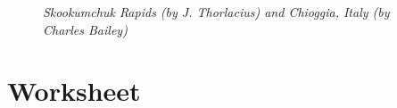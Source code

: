 \documentclass[letterpaper,12pt]{article}
\begin{document}
\begin{figure}[h]
\noindent{}
\caption{\protect\it{\small Skookumchuk Rapids (by J. Thorlacius) and Chioggia, Italy (by Charles Bailey)}}
\label{plt:contrasts}
\end{figure}

\clearpage

\section{Worksheet}
\end{document}
